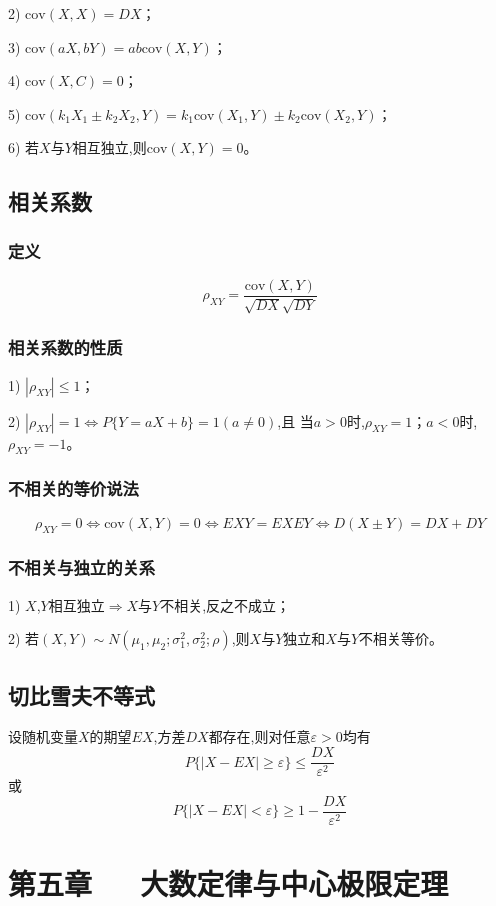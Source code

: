 \documentclass[UTF8]{ctexart}
\theoremstyle{remark}
\begin{document}
		2) \(\mathrm{cov}(X,X)=DX\)；
		
		3) \(\mathrm{cov}(aX,bY)=ab\mathrm{cov}(X,Y)\)；
		
		4) \(\mathrm{cov}(X,C)=0\)；
		
		5) \(\mathrm{cov}(k_1X_1\pm k_2X_2,Y)=k_1\mathrm{cov}(X_1,Y)\pm k_2\mathrm{cov}(X_2,Y)\)；
		
		6) 若\(X\)与\(Y\)相互独立,则\(\mathrm{cov}(X,Y)=0\)。
		
		\subsection{相关系数}
		\subsubsection{定义}
		\[
		\rho_{XY}=\frac{\mathrm{cov}(X,Y)}{\sqrt{DX}\sqrt{DY}}
		\]
		\subsubsection{相关系数的性质}
		1) \(|\rho_{XY}|\leq1\)；
		
		2) \(|\rho_{XY}| = 1\Leftrightarrow P\{Y = aX + b\} = 1 (a\neq0)\),且
		当\(a > 0\)时,\(\rho_{XY} = 1\)；\(a < 0\)时,\(\rho_{XY} = - 1\)。
		\subsubsection{不相关的等价说法}
		\[
		\rho_{XY} = 0\Leftrightarrow\mathrm{cov}(X,Y) = 0\Leftrightarrow EXY = EXEY\Leftrightarrow D(X\pm Y)=DX + DY
		\]
		\subsubsection{不相关与独立的关系}
		1) \(X\),\(Y\)相互独立\(\Rightarrow X\)与\(Y\)不相关,反之不成立；
		
		2) 若\((X,Y)\sim N(\mu_1,\mu_2;\sigma_1^{2},\sigma_2^{2};\rho)\),则\(X\)与\(Y\)独立和\(X\)与\(Y\)不相关等价。
		
		\subsection{切比雪夫不等式}
		设随机变量\(X\)的期望\(EX\),方差\(DX\)都存在,则对任意\(\varepsilon>0\)均有
		\[
		P\{|X - EX|\geq\varepsilon\}\leq\frac{DX}{\varepsilon^{2}}
		\]
		或
		\[
		P\{|X - EX|<\varepsilon\}\geq1 - \frac{DX}{\varepsilon^{2}}
		\]
		
		\section{第五章~~~大数定律与中心极限定理}
		
\end{document}
